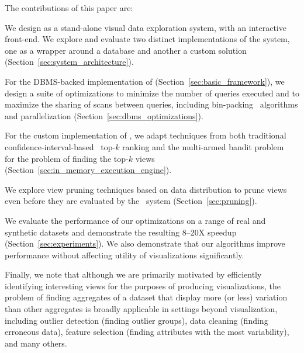 The contributions of this paper are:
\begin{denselist}
  \item We design \VizRecDB as a stand-alone visual data exploration system,
  with an interactive front-end. We explore and evaluate two distinct implementations of the system, one as a
  wrapper around a database and another a custom solution (Section~\ref{sec:system_architecture}).
  \item For the DBMS-backed implementation of \VizRecDB (Section~\ref{sec:basic_framework}), we
  design a suite of optimizations to minimize the number of queries executed and to
  maximize the sharing of scans between queries, 
  including bin-packing~\cite{garey} algorithms and parallelization
  (Section~\ref{sec:dbms_optimizations}).
  \item For the custom implementation of \VizRecDB,  we adapt techniques 
  from both traditional confidence-interval-based~\cite{hoeffding1963probability} top-$k$ ranking and the
   multi-armed bandit problem~\cite{bandits} 
   for the problem of finding the top-$k$ views (Section~\ref{sec:in_memory_execution_engine}).
  \item We explore view pruning techniques based on data distribution
  to prune views even before they are evaluated by the \VizRecDB\ system 
  (Section~\ref{sec:pruning}).
  \item We evaluate the performance of our optimizations on a range of
  real and synthetic datasets and demonstrate the resulting 8--20X speedup 
  (Section~\ref{sec:experiments}). We also demonstrate that our algorithms
  improve performance without affecting utility of visualizations significantly.
\end{denselist}
Finally, we note that although we are primarily motivated by efficiently 
identifying interesting views for the purposes of producing visualizations, 
the problem of finding aggregates of a dataset that display more (or less) variation
than other aggregates is broadly applicable in settings beyond visualization, including
outlier detection (finding outlier groups), data cleaning (finding erroneous 
data), feature selection (finding attributes with the most variability), and 
many others.






